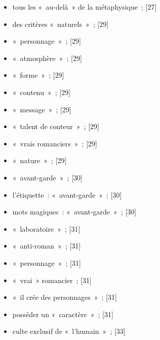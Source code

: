 \documentclass[12pt, a4paper]{article}
\begin{document}
\begin{itemize}
    \item tous les «~au-delà~» de la métaphysique{\color{gray}~; [27]}

    \item des critères «~naturels~»{\color{gray}~; [29]}

    \item «~personnage~»{\color{gray}~; [29]}

    \item «~atmosphère~»{\color{gray}~; [29]}

    \item «~forme~»{\color{gray}~; [29]}

    \item «~contenu~»{\color{gray}~; [29]}

    \item «~message~»{\color{gray}~; [29]}

    \item «~talent de conteur~»{\color{gray}~; [29]}

    \item «~vrais romanciers~»{\color{gray}~; [29]}

    \item «~nature~»{\color{gray}~; [29]}

    \item «~avant-garde~»{\color{gray}~; [30]}

    \item l’étiquette~: «~avant-garde~»{\color{gray}~; [30]}

    \item mots magiques~: «~avant-garde~»{\color{gray}~; [30]}

    \item «~laboratoire~»{\color{gray}~; [31]}

    \item «~anti-roman~»{\color{gray}~; [31]}

    \item «~personnage~»{\color{gray}~; [31]}

    \item «~vrai~» romancier{\color{gray}~; [31]}

    \item «~il crée des personnages~»{\color{gray}~; [31]}

    \item posséder un «~caractère~»{\color{gray}~; [31]}

    \item culte exclusif de «~l’humain~»{\color{gray}~; [33]}


\end{itemize}
\end{document}
